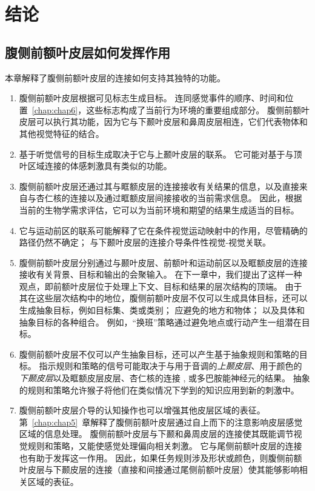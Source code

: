 \section{结论}

\subsection{腹侧前额叶皮层如何发挥作用}
\par

本章解释了腹侧前额叶皮层的连接如何支持其独特的功能。


\begin{enumerate}
\item 腹侧前额叶皮层根据可见标志生成目标。 
连同感觉事件的顺序、时间和位置~\ref{chap:chap6}，这些标志构成了当前行为环境的重要组成部分。
腹侧前额叶皮层可以执行其功能，因为它与下颞叶皮层和鼻周皮层相连，它们代表物体和其他视觉特征的结合。
\item 基于听觉信号的目标生成取决于它与上颞叶皮层的联系。
它可能对基于与顶叶区域连接的体感刺激具有类似的功能。
\item 腹侧前额叶皮层还通过其与眶额皮层的连接接收有关结果的信息，以及直接来自与杏仁核的连接以及通过眶额皮层间接接收的当前需求信息。
因此，根据当前的生物学需求评估，它可以为当前环境和期望的结果生成适当的目标。
\item 它与运动前区的联系可能解释了它在条件视觉运动映射中的作用，尽管精确的路径仍然不确定；
与下颞叶皮层的连接介导条件性视觉-视觉关联。
\item 腹侧前额叶皮层分别通过与颞叶皮层、前额叶和运动前区以及眶额皮层的连接接收有关背景、目标和输出的会聚输入。
在下一章中，我们提出了这样一种观点，即前额叶皮层位于处理上下文、目标和结果的层次结构的顶端。
由于其在这些层次结构中的地位，腹侧前额叶皮层不仅可以生成具体目标，还可以生成抽象目标，例如目标集、类或类别； 应避免的地方和物体； 以及具体和抽象目标的各种组合。
例如，“换班”策略通过避免地点或行动产生一组潜在目标。
\item 腹侧前额叶皮层不仅可以产生抽象目标，还可以产生基于抽象规则和策略的目标。 
指示规则和策略的信号可能取决于与用于音调的\textit{上颞皮层}\cite{wallis2001single}、用于颜色的\textit{下颞皮层}\cite{tsujimoto2010evaluating}以及眶额皮层皮层、杏仁核的连接 , 或多巴胺能神经元的结果。
抽象的规则和策略允许猴子将他们在类似情况下学到的知识应用到新的刺激中。
\item 腹侧前额叶皮层介导的认知操作也可以增强其他皮层区域的表征。
第~\ref{chap:chap5}~章解释了腹侧前额叶皮层通过自上而下的注意影响皮层感觉区域的信息处理。
腹侧前额叶皮层与下颞和鼻周皮层的连接使其既能调节视觉规则和策略，又能使感觉处理偏向相关刺激。
它与尾侧前额叶皮层的连接也有助于发挥这一作用。
因此，如果任务规则涉及形状或颜色，则腹侧前额叶皮层与下颞皮层的连接（直接和间接通过尾侧前额叶皮层）使其能够影响相关区域的表征。
\end{enumerate}




